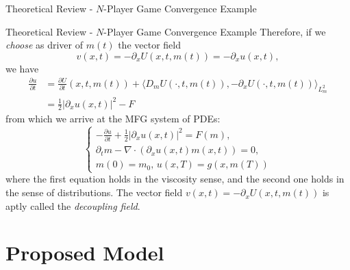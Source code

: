 \documentclass{beamer}
\begin{document}
{\begin{frame}{Theoretical Review - $N$-Player Game Convergence Example}
\end{frame}

\begin{frame}{Theoretical Review - $N$-Player Game Convergence Example}
        Therefore, if we \textit{choose} as driver of $m(t)$ the vector field 
\begin{equation*}
    v(x,t) = - \partial_x U(x,t,m(t)) = - \partial_x u(x,t),
\end{equation*}
    we have
\begin{align*}
    \frac{\partial u}{\partial t} &=  \frac{\partial U}{ \partial t}(x,t,m(t)) + \langle D_m U(\cdot, t, m(t) ), - \partial_x U(\cdot, t, m(t) ) \rangle_{L^2_m}\\
    &= \frac{1}{2} |\partial_x u(x,t)|^2 - F
\end{align*}
    from which we arrive at the MFG system of PDEs:
\begin{equation}
    \begin{cases}
        - \frac{\partial u}{\partial t} + \frac{1}{2} |\partial_x u(x,t)|^2  = F(m), \\
        \partial_t m - \nabla \cdot( \partial_x u(x,t) m(x,t) ) = 0,\\
        m(0) = m_0, \, u(x,T) = g(x, m(T))
    \end{cases}
\end{equation}
    where the first equation holds in the viscosity sense, and the second
    one holds in the sense of distributions.
    The vector field $v(x,t) = -\partial_x U(x,t,m(t))$ is aptly called the \textit{decoupling field}.
\end{frame}

}\fi
\section{Proposed Model}
\end{document}

